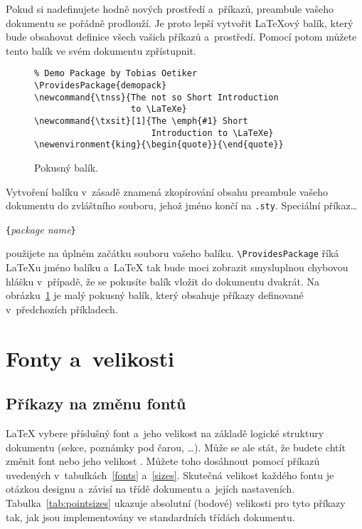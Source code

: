Pokud si nadefinujete hodně nových prostředí a~příkazů, preambule
vašeho dokumentu se pořádně prodlouží. Je proto lepší vytvořit
\LaTeX ový balík, který bude obsahovat definice všech vašich příkazů
a~prostředí. Pomocí  potom můžete tento balík
ve svém dokumentu zpřístupnit.

\begin{figure}[!htbp]
\begin{lined}{\textwidth}
\begin{verbatim}
% Demo Package by Tobias Oetiker
\ProvidesPackage{demopack}
\newcommand{\tnss}{The not so Short Introduction 
                   to \LaTeXe}
\newcommand{\txsit}[1]{The \emph{#1} Short 
                       Introduction to \LaTeXe}
\newenvironment{king}{\begin{quote}}{\end{quote}}
\end{verbatim}
\end{lined}
\caption{Pokusný balík.} \label{package}
\end{figure}

Vytvoření balíku v~zásadě znamená zkopírování obsahu preambule
vašeho dokumentu do zvláštního souboru, jehož jméno končí na
\texttt{.sty}. Speciální příkaz\dots
\begin{lscommand}
\verb|{|\emph{package name}\verb|}|
\end{lscommand}
\noindent použijete na úplném začátku souboru vašeho balíku.
\verb|\ProvidesPackage| říká \LaTeX u jméno balíku a~\LaTeX{}
tak bude moci zobrazit smysluplnou chybovou hlášku v~případě,
že se pokusíte balík vložit do dokumentu dvakrát. Na obrázku~\ref{package}
je malý pokusný balík, který obsahuje příkazy definované v~předchozích
příkladech.

\section{Fonty a~velikosti}

\subsection{Příkazy na změnu fontů}
 \LaTeX{} vybere příslušný font a~jeho velikost
na základě logické struktury dokumentu (sekce, poznámky pod čarou, \ldots).
Může se ale stát, že %
budete chtít změnit font nebo jeho velikost .
Můžete toho dosáhnout pomocí příkazů uvedených v~tabulkách~\ref{fonts} a~\ref{sizes}.
Skutečná velikost každého fontu je otázkou designu a~závisí na třídě dokumentu
a~jejích nastaveních. Tabulka~\ref{tab:pointsizes} ukazuje absolutní (bodové) velikosti 
pro tyto příkazy tak, jak jsou implementovány ve standardních třídách dokumentu.


